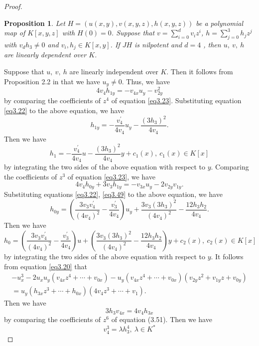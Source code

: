 \documentclass[12pt, twoside, leqno]{article}
\newtheorem{prop}[thm]{Proposition}
\theoremstyle{definition}
\numberwithin{equation}{section}
\begin{document}
\begin{proof}
\begin{prop}\label{prop3.6}
Let $H=(u(x,y),v(x,y,z),h(x,y,z))$ be a polynomial map of $K[x,y,z]$ with $H(0)= 0$. Suppose that  $v=\sum_{i=0}^dv_iz^i$, $h=\sum_{j=0}^3h_jz^j$ with $v_dh_3\neq 0$ and $v_i, h_j\in K[x,y]$. If $JH$ is nilpotent and $d=4$ , then $u,~v,~h$ are linearly dependent over $K$.
\end{prop}

Suppose that $u,~v,~h$ are linearly independent over $K$. Then it follows from Proposition 2.2 in \cite{13} that we have $u_y\neq 0$.
Thus, we have
$$4v_4h_{1y}=-v_{4x}u_y-v_{2y}^2$$
by comparing the coefficients of $z^4$ of equation \eqref{eq3.23}. Substituting equation \eqref{eq3.22} to the above equation, we have
$$h_{1y}=-\frac{v_4^{'}}{4v_4}u_y-\frac{(3h_3)^2}{4v_4}.$$
Then we have
\begin{equation}\label{eq3.49}
h_1=-\frac{v_4^{'}}{4v_4}u-\frac{(3h_3)^2}{4v_4}y+c_1(x),~c_1(x)\in K[x]
\end{equation}
by integrating the two sides of the above equation with respect to $y$. Comparing the coefficients of $z^3$ of equation \eqref{eq3.23}, we have
$$4v_4h_{0y}+3v_3h_{1y}=-v_{3x}u_y-2v_{2y}v_{1y}.$$
Substituting equations \eqref{eq3.22}, \eqref{eq3.49} to the above equation, we have
$$h_{0y}=\left( \frac{3v_3v_{4}^{'}}{(4v_{4})^{2}}-\frac{v_3^{'}}{4v_{4}}\right)u_{y}+\frac{3v_3(3h_{3})^{2}}{(4v_{4})^{2}}-\frac{12h_{3}h_{2}}{4v_{4}} .$$
Then we have
\begin{equation}\label{eq3.50}
h_{0}=\left( \frac{3v_3v_{4}^{'}}{(4v_{4})^{2}}-\frac{v_3^{'}}{4v_{4}}\right)u+\left(\frac{3v_3(3h_{3})^{2}}{(4v_{4})^{2}}-\frac{12h_{3}h_{2}}{4v_{4}}\right)y +c_2(x),~c_2(x)\in K[x]
\end{equation}
by integrating the two sides of the above equation with respect to $y$. It follows from equation \eqref{eq3.20} that
\begin{equation}\label{eq3.51}
\begin{split}
-u_{x}^{3}-2u_{x}u_{y}\left(v_{4x}z^{4}+\cdots+v_{0x}\right)-u_{y}\left(v_{4x}z^{4}+\cdots+v_{0x}\right) \left( v_{2y}z^{2}+v_{1y}z+v_{0y}\right)\\=u_{y}\left( h_{3x}z^{3}+\cdots+h_{0x}\right) \left( 4v_{4}z^{3}+\cdots+v_{1}\right).
\end{split}
\end{equation}
Then we have
$$3h_3v_{4x}=4v_4h_{3x}$$
by comparing the coefficients of $z^6$ of equation (3.51). Then we have
\begin{equation}\label{eq3.52}
v_4^3=\lambda h_3^4,~\lambda\in K^*

\end{equation}
\end{proof}
\end{document}
